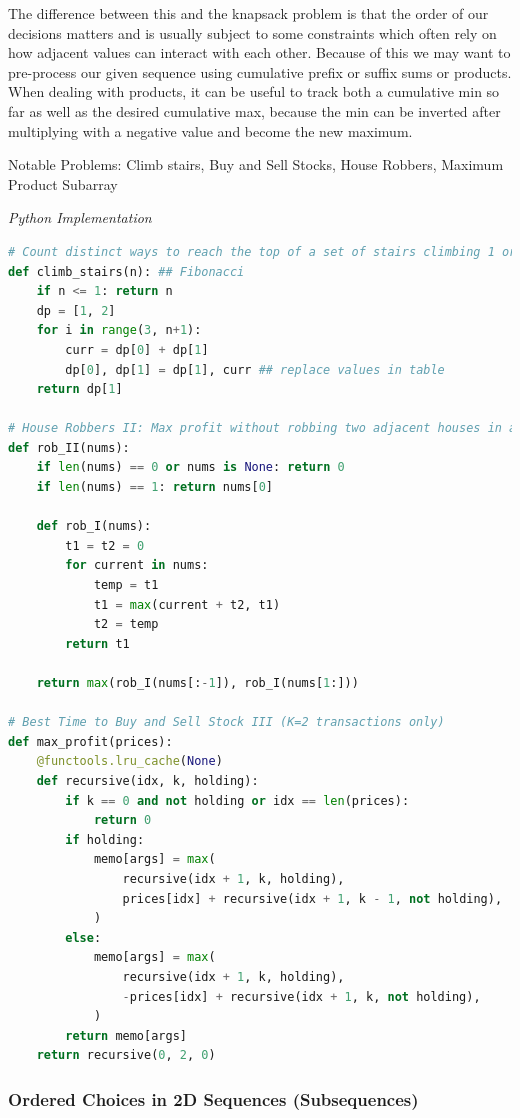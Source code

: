 \documentclass{article}
\begin{document}
The difference between this and the knapsack problem is that the order of our decisions matters and is usually subject to some constraints which often rely on how adjacent values can interact with each other. Because of this we may want to pre-process our given sequence using cumulative prefix or suffix sums or products. When dealing with products, it can be useful to track both a cumulative min so far as well as the desired cumulative max, because the min can be inverted after multiplying with a negative value and become the new maximum.

Notable Problems: Climb stairs, Buy and Sell Stocks, House Robbers, Maximum Product Subarray

\vspace{8pt} \emph{Python Implementation}
\begin{lstlisting}[language=Python]
# Count distinct ways to reach the top of a set of stairs climbing 1 or 2 steps at a time
def climb_stairs(n): ## Fibonacci
    if n <= 1: return n
    dp = [1, 2]
    for i in range(3, n+1):
        curr = dp[0] + dp[1]
        dp[0], dp[1] = dp[1], curr ## replace values in table
    return dp[1]

# House Robbers II: Max profit without robbing two adjacent houses in a circular street
def rob_II(nums):
    if len(nums) == 0 or nums is None: return 0
    if len(nums) == 1: return nums[0]
        
    def rob_I(nums):
        t1 = t2 = 0
        for current in nums:
            temp = t1
            t1 = max(current + t2, t1)
            t2 = temp
        return t1
    
    return max(rob_I(nums[:-1]), rob_I(nums[1:]))

# Best Time to Buy and Sell Stock III (K=2 transactions only)
def max_profit(prices):
    @functools.lru_cache(None)
    def recursive(idx, k, holding):
        if k == 0 and not holding or idx == len(prices):
            return 0
        if holding:
            memo[args] = max(
                recursive(idx + 1, k, holding),
                prices[idx] + recursive(idx + 1, k - 1, not holding),
            )
        else:
            memo[args] = max(
                recursive(idx + 1, k, holding),
                -prices[idx] + recursive(idx + 1, k, not holding),
            )
        return memo[args]
    return recursive(0, 2, 0)
\end{lstlisting}

\subsubsection*{Ordered Choices in 2D Sequences (Subsequences)}
\end{document}
